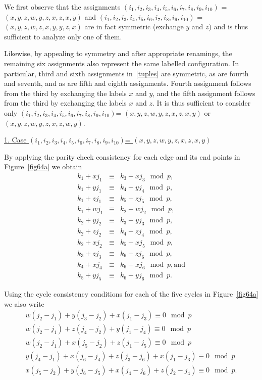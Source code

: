 We first observe that the assignments
$(i_1,i_2,i_3,i_4,i_5,i_6,i_7,i_8,i_9,i_{10})$
=$(x,y,z,w,y,z,x,z,x,y)$ and
$(i_1,i_2,i_3,i_4,i_5,i_6,i_7,i_8,i_9,i_{10})$
=$(x,y,z,w,z,x,y,y,z,x)$ are in fact symmetric (exchange $y$ and
$z$) and is thus sufficient to analyze only one of them.

Likewise, by appealing to symmetry and after appropriate
renamings, the remaining six assignments also represent the same
labelled configuration. In particular, third and sixth assignments
in~\eqref{tuples} are symmetric,  as are fourth and seventh, and
as are fifth and eighth assignments. Fourth assignment follows
from the third by exchanging the labels $x$ and $y$, and the fifth
assignment follows from the third by exchanging the labels $x$ and
$z$. It is thus sufficient to consider only
$(i_1,i_2,i_3,i_4,i_5,i_6,i_7,i_8,i_9,i_{10})$=
$(x,y,z,w,y,z,x,z,x,y)$ or $(x,y,z,w,y,z,x,z,w,y)$.

\underline{1. Case $(i_1,i_2,i_3,i_4,i_5,i_6,i_7,i_8,i_9,i_{10})$=
$(x,y,z,w,y,z,x,z,x,y)$}

By applying the parity check consistency for each edge and its end
points in Figure~\ref{fig64a} we obtain
\begin{equation}\label{con64a}\begin{array}{cccc}
k_1+xj_1 &\equiv& k_3+xj_3 \mod p, \\
k_1+yj_1 &\equiv& k_4+yj_4 \mod p,\\
k_1+zj_1 &\equiv& k_5+zj_5 \mod p, \\
k_1+wj_1 &\equiv& k_2+wj_2 \mod p, \\
k_2+yj_2 &\equiv& k_3+yj_3 \mod p, \\
k_2+zj_2 &\equiv& k_4+zj_4 \mod p, \\
k_2+xj_2 &\equiv& k_5+xj_5 \mod p, \\
k_3+zj_3 &\equiv& k_6+zj_6 \mod p, \\
k_4+xj_4 &\equiv& k_6+xj_6 \mod p,\text{and} \\
k_5+yj_5 &\equiv& k_6+yj_6 \mod p.
\end{array}\end{equation}

Using the cycle consistency conditions for each of the five cycles
in Figure~\ref{fig64a} we also write
\begin{equation}\label{con64b}\begin{array}{cccc}
w(j_2-j_1)+y(j_3-j_2)+x(j_1-j_3) \equiv 0 \mod p\\
w(j_2-j_1)+z(j_4-j_2)+y(j_1-j_4) \equiv 0 \mod p\\
w(j_2-j_1)+x(j_5-j_2)+z(j_1-j_5) \equiv 0 \mod p\\
y(j_4-j_1)+x(j_6-j_4)+z(j_3-j_6)+x(j_1-j_3) \equiv 0 \mod p\\
x(j_5-j_2)+y(j_6-j_5)+x(j_4-j_6)+z(j_2-j_4) \equiv 0 \mod p.
\end{array}\end{equation}



